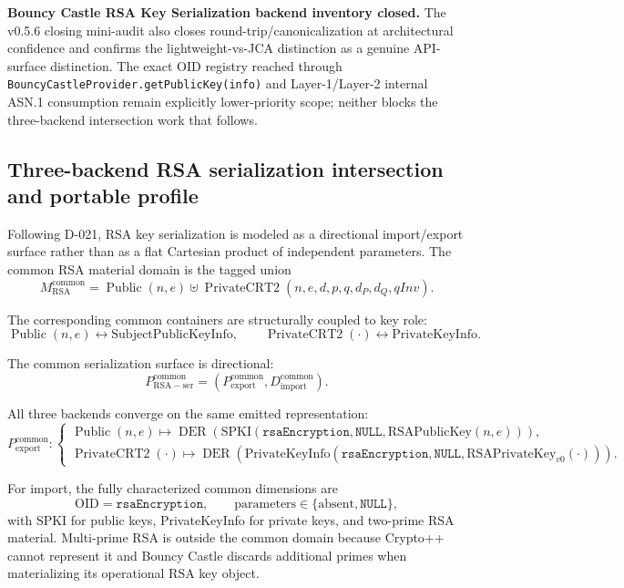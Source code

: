 \documentclass[11pt,a4paper]{article}
\begin{document}
\textbf{Bouncy Castle RSA Key Serialization backend inventory closed.} The v0.5.6 closing mini-audit also closes round-trip/canonicalization at architectural confidence and confirms the lightweight-vs-JCA distinction as a genuine API-surface distinction. The exact OID registry reached through \texttt{BouncyCastleProvider.getPublicKey(info)} and Layer-1/Layer-2 internal ASN.1 consumption remain explicitly lower-priority scope; neither blocks the three-backend intersection work that follows.

\subsection{Three-backend RSA serialization intersection and portable profile}
\label{sec:rsa-ser-profile}

Following D-021, RSA key serialization is modeled as a directional
import/export surface rather than as a flat Cartesian product of
independent parameters. The common RSA material domain is the tagged
union
\[
M_{\mathrm{RSA}}^{\mathrm{common}}
=
\operatorname{Public}(n,e)
\uplus
\operatorname{PrivateCRT2}
(n,e,d,p,q,d_P,d_Q,qInv).
\]

The corresponding common containers are structurally coupled to key
role:
\[
\operatorname{Public}(n,e)
\leftrightarrow
\mathrm{SubjectPublicKeyInfo},
\qquad
\operatorname{PrivateCRT2}(\cdot)
\leftrightarrow
\mathrm{PrivateKeyInfo}.
\]

The common serialization surface is directional:
\[
P_{\mathrm{RSA-ser}}^{\mathrm{common}}
=
\left(
P_{\mathrm{export}}^{\mathrm{common}},
D_{\mathrm{import}}^{\mathrm{common}}
\right).
\]

All three backends converge on the same emitted representation:
\[
P_{\mathrm{export}}^{\mathrm{common}}:
\begin{cases}
\operatorname{Public}(n,e)
\mapsto
\operatorname{DER}\!\left(
\mathrm{SPKI}
(\texttt{rsaEncryption},\texttt{NULL},
\mathrm{RSAPublicKey}(n,e))
\right),\\[1mm]
\operatorname{PrivateCRT2}(\cdot)
\mapsto
\operatorname{DER}\!\left(
\mathrm{PrivateKeyInfo}
(\texttt{rsaEncryption},\texttt{NULL},
\mathrm{RSAPrivateKey}_{v0}(\cdot))
\right).
\end{cases}
\]

For import, the fully characterized common dimensions are
\[
\mathrm{OID}=\texttt{rsaEncryption},
\qquad
\mathrm{parameters}\in
\{\mathrm{absent},\texttt{NULL}\},
\]
with SPKI for public keys, PrivateKeyInfo for private keys, and
two-prime RSA material. Multi-prime RSA is outside the common domain
because Crypto++ cannot represent it and Bouncy Castle discards
additional primes when materializing its operational RSA key object.
\end{document}
